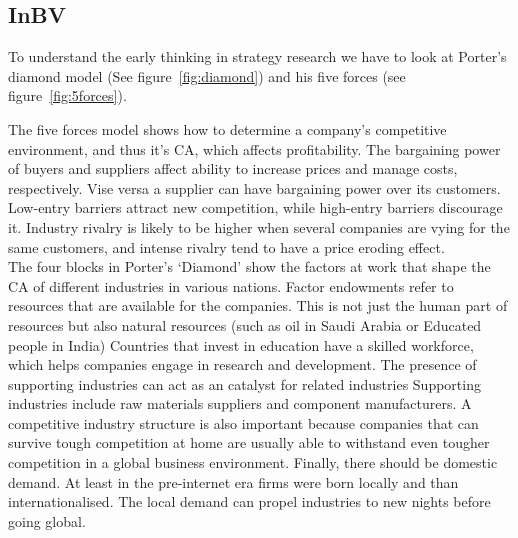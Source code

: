\subsection{\glsdesc{InBV}} %


To understand the early thinking in strategy research we have to look at Porter's diamond model (See figure~\ref{fig:diamond}) and his five forces (see figure~\ref{fig:5forces}).  


The five forces model shows how to determine a company's competitive environment, and thus it's \gls{CA}, which affects profitability. 
The bargaining power of buyers and suppliers affect ability to increase prices and manage costs, respectively. 
Vise versa a supplier can have bargaining power over its customers. Low-entry barriers attract new competition, while high-entry barriers discourage it. 
Industry rivalry is likely to be higher when several companies are vying for the same customers, and intense rivalry tend to have a price eroding effect.\\


The four blocks in Porter's `Diamond' show the factors at work that shape the \gls{CA} of different industries in various nations.
Factor endowments refer to resources that are available for the companies. This is not just the human part of resources but also natural resources (such as oil in Saudi Arabia or Educated people in India)
Countries that invest in education have a skilled workforce, which helps companies engage in research and development. 
The presence of supporting industries can act as an catalyst for related industries
Supporting industries include raw materials suppliers and component manufacturers. 
A competitive industry structure is also important because companies that can survive tough competition at home are usually able to withstand even tougher competition in a global business environment.
Finally, there should be domestic demand. At least in the pre-internet era firms were born locally and than internationalised. The local demand can propel industries to new nights before going global.



